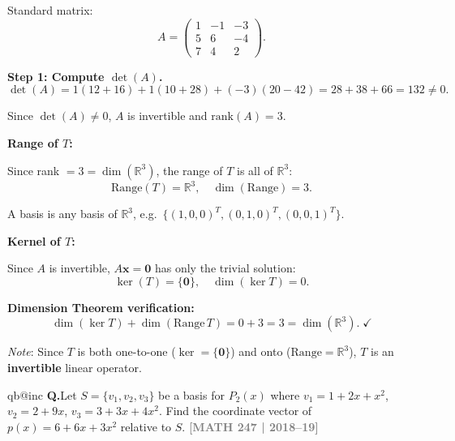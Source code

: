 \documentclass[12pt,a3paper]{article}
\makeatletter
\newcommand{\yr}[1]{\hfill\textcolor{gray}{\small\textbf{[#1]}}}
\newcounter{qnum}
\newcommand{\Q}[1]{%
  \csname qb@inc\endcsname
  \needspace{4\baselineskip}
  \refstepcounter{qnum}
  \vspace{6pt}
  \noindent\textbf{Q\theqnum.}\enspace #1\par
}
\makeatother
\begin{document}
\begin{tcolorbox}[enhanced,breakable,
  colback=cF!4,colframe=cF,boxrule=0.8pt,arc=5pt,
  title={\textbf{Answer --- $T(x,y,z)=(x-y-3z,\;5x+6y-4z,\;7x+4y+2z)$: Range, Kernel, Dimension Theorem}},
  fonttitle=\bfseries\color{white},colbacktitle=cF]

Standard matrix:
\[
A=\begin{pmatrix}1&-1&-3\\5&6&-4\\7&4&2\end{pmatrix}.
\]

\textbf{Step 1: Compute $\det(A)$.}
\[
\det(A)=1(12+16)+1(10+28)+(-3)(20-42)=28+38+66=132\neq0.
\]

Since $\det(A)\neq0$, $A$ is invertible and $\mathrm{rank}(A)=3$.

\textbf{Range of $T$:}

Since rank $=3=\dim(\mathbb{R}^3)$, the range of $T$ is all of $\mathbb{R}^3$:
\[
\boxed{\mathrm{Range}(T)=\mathbb{R}^3,\quad\dim(\mathrm{Range})=3.}
\]

A basis is any basis of $\mathbb{R}^3$, e.g.\ $\{(1,0,0)^T,(0,1,0)^T,(0,0,1)^T\}$.

\textbf{Kernel of $T$:}

Since $A$ is invertible, $A\mathbf{x}=\mathbf{0}$ has only the trivial solution:
\[
\boxed{\ker(T)=\{\mathbf{0}\},\quad\dim(\ker T)=0.}
\]

\textbf{Dimension Theorem verification:}
\[
\dim(\ker T)+\dim(\mathrm{Range}\,T)=0+3=3=\dim(\mathbb{R}^3).\;\checkmark
\]

\textit{Note}: Since $T$ is both one-to-one ($\ker=\{\mathbf{0}\}$) and onto ($\mathrm{Range}=\mathbb{R}^3$), $T$ is an \textbf{invertible} linear operator.

\end{tcolorbox}

\Q{Let $S = \{v_1, v_2, v_3\}$ be a basis for $P_2(x)$ where $v_1 = 1 + 2x + x^2$, $v_2 = 2 + 9x$, $v_3 = 3 + 3x + 4x^2$. Find the coordinate vector of $p(x) = 6 + 6x + 3x^2$ relative to $S$.
\yr{MATH 247 | 2018--19}}
\end{document}
